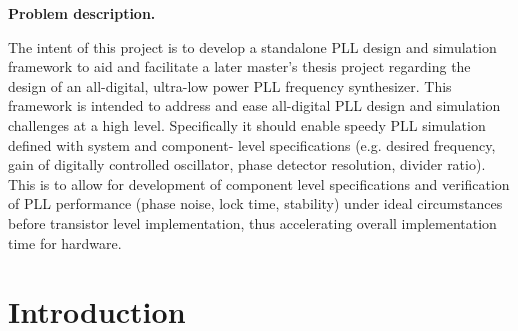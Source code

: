 	\pagebreak
	\thispagestyle{nohdr}
	\null\pagebreak
	\thispagestyle{nohdr}
	\Huge\textbf{Problem description.}\\
	\large\fontfamily{\rmdefault}\selectfont 
	
	The intent of this project is to develop a standalone PLL design and simulation framework to aid and facilitate a later master's thesis project regarding the design of an all-digital, ultra-low power PLL frequency synthesizer. This framework is intended to address and ease all-digital PLL design and simulation challenges at a high level. Specifically it should enable speedy PLL simulation defined with system and component- level specifications (e.g. desired frequency, gain of digitally controlled oscillator, phase detector resolution, divider ratio). This is to allow for development of component level specifications and verification of PLL performance (phase noise, lock time, stability) under ideal circumstances before transistor level implementation, thus accelerating overall implementation time for hardware.


	\fontfamily{\sfdefault}\selectfont 
	\thispagestyle{nohdr}
	\null\pagebreak
	\thispagestyle{nohdr}
	\null\pagebreak
	\tableofcontents
	\pagebreak
	\listoffigures
	\listoftables


	\fontfamily{\rmdefault}\selectfont 
	\pagebreak
	
	\pagebreak
	\null

	\pagebreak
	\FloatBarrier

	\section{Introduction}\label{intro}
	
	\pagebreak
	\FloatBarrier

